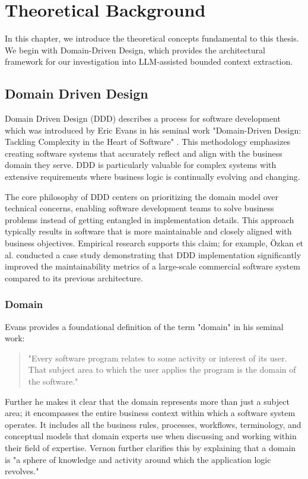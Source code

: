 \chapter{Theoretical Background}\label{chapter:theoreticalbg}
In this chapter, we introduce the theoretical concepts fundamental to this thesis. We begin with Domain-Driven Design, which provides the architectural framework for our investigation into LLM-assisted bounded context extraction.

\section{Domain Driven Design}\label{sec:ddd}
Domain Driven Design (DDD) describes a process for software development which was introduced by Eric Evans in his seminal work "Domain-Driven Design: Tackling Complexity in the Heart of Software" \autocite{evans2004domain}. This methodology emphasizes creating software systems that accurately reflect and align with the business domain they serve. DDD is particularly valuable for complex systems with extensive requirements where business logic is continually evolving and changing.

The core philosophy of DDD centers on prioritizing the domain model over technical concerns, enabling software development teams to solve business problems instead of getting entangled in implementation details. This approach typically results in software that is more maintainable and closely aligned with business objectives. Empirical research supports this claim; for example, Özkan et al. \autocite{ddd-maintainability} conducted a case study demonstrating that DDD implementation significantly improved the maintainability metrics of a large-scale commercial software system compared to its previous architecture.

\subsection{Domain}
Evans provides a foundational definition of the term "domain" in his seminal work:
\begin{quote}
"Every software program relates to some activity or interest of its user. That subject area to which the user applies the program is the domain of the software."
\autocite[p.~4]{evans2004domain}
\end{quote}
Further he makes it clear that the domain represents more than just a subject area; it encompasses the entire business context within which a software system operates. It includes all the business rules, processes, workflows, terminology, and conceptual models that domain experts use when discussing and working within their field of expertise. Vernon \autocite[p.~17]{vernon2013implementing} further clarifies this by explaining that a domain is "a sphere of knowledge and activity around which the application logic revolves."

